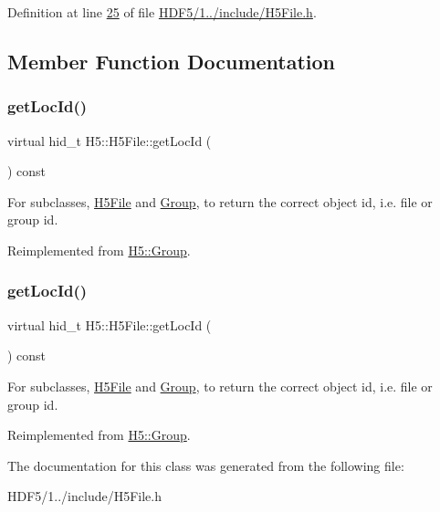 Definition at line \hyperlink{_h_d_f5_21_810_81_2include_2_h5_file_8h_source_l00025}{25} of file \hyperlink{_h_d_f5_21_810_81_2include_2_h5_file_8h_source}{H\+D\+F5/1../include/\+H5\+File.\+h}.



\subsection{Member Function Documentation}
\mbox{\label{class_h5_1_1_h5_file_ab1c5775703262ac913dd164e77d60abc}} 
\subsubsection{\texorpdfstring{get\+Loc\+Id()}{getLocId()}\hspace{0.1cm}{\footnotesize\ttfamily [1/2]}}
{\footnotesize\ttfamily virtual hid\+\_\+t H5\+::\+H5\+File\+::get\+Loc\+Id (\begin{DoxyParamCaption}{ }\end{DoxyParamCaption}) const\hspace{0.3cm}{\ttfamily [virtual]}}

For subclasses, \hyperlink{class_h5_1_1_h5_file}{H5\+File} and \hyperlink{class_h5_1_1_group}{Group}, to return the correct object id, i.\+e. file or group id. 

Reimplemented from \hyperlink{class_h5_1_1_group_ae8fa39e9d934d254cd1bc2302a7e6391}{H5\+::\+Group}.

\mbox{\label{class_h5_1_1_h5_file_ab1c5775703262ac913dd164e77d60abc}} 
\subsubsection{\texorpdfstring{get\+Loc\+Id()}{getLocId()}\hspace{0.1cm}{\footnotesize\ttfamily [2/2]}}
{\footnotesize\ttfamily virtual hid\+\_\+t H5\+::\+H5\+File\+::get\+Loc\+Id (\begin{DoxyParamCaption}{ }\end{DoxyParamCaption}) const\hspace{0.3cm}{\ttfamily [virtual]}}

For subclasses, \hyperlink{class_h5_1_1_h5_file}{H5\+File} and \hyperlink{class_h5_1_1_group}{Group}, to return the correct object id, i.\+e. file or group id. 

Reimplemented from \hyperlink{class_h5_1_1_group_ae8fa39e9d934d254cd1bc2302a7e6391}{H5\+::\+Group}.



The documentation for this class was generated from the following file\+:\begin{DoxyCompactItemize}
\item 
H\+D\+F5/1../include/\+H5\+File.\+h\end{DoxyCompactItemize}
